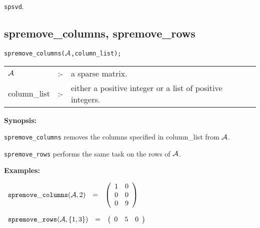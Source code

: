 \hspace*{0.175in} {\tt spsvd}.

\subsection{spremove\_columns, spremove\_rows}

\hspace*{0.175in} {\tt spremove\_columns(${\cal A}$,column\_list);}

\hspace*{0.1in}  
\begin{tabular}{l l l} 
${\cal A}$   &:-& a sparse matrix. \\
column\_list &:-& either a positive integer or a list of 
                  positive integers.
\end{tabular}

{\bf Synopsis:}

\hspace*{0.175in} {\tt spremove\_columns} removes the columns specified in
                column\_list from ${\cal A}$. 

\hspace*{0.175in} {\tt spremove\_rows} performs the same task on the rows 
                of ${\cal A}$.

{\bf Examples:} 

\begin{flushleft}  
\hspace*{0.1in}
\begin{math}  
\begin{array}{ccc}
{\tt spremove\_columns}({\cal A},2) & = & 
        \left( \begin{array}{cc} 1 & 0 \\ 0 & 0 \\ 0 & 9  
 \end{array} \right) 
\end{array}
\end{math}  
\end{flushleft}

\vspace*{0.1in}

\begin{flushleft}  
\hspace*{0.1in}
\begin{math}  
\begin{array}{ccc}
{\tt spremove\_rows}({\cal A},\{1,3\}) & = & 
        \left( \begin{array}{ccc} 0 & 5 & 0
 \end{array} \right) 
\end{array}
\end{math}  
\end{flushleft}


